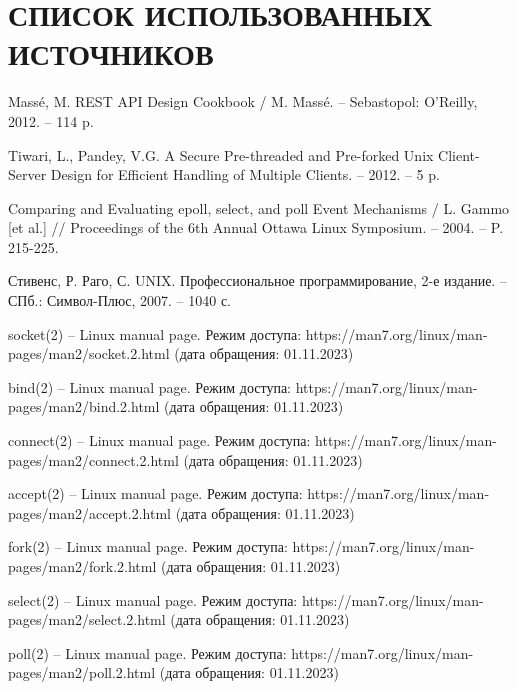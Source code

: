 \section*{СПИСОК ИСПОЛЬЗОВАННЫХ ИСТОЧНИКОВ}

\begingroup
\renewcommand{\section}[2]{}
\begin{thebibliography}{}
	Massé, M. REST API Design Cookbook / M. Massé. -- Sebastopol: O’Reilly, 2012. -- 114 p.
	
	Tiwari, L., Pandey, V.G. A Secure Pre-threaded and Pre-forked Unix Client-Server Design for Efficient Handling of Multiple Clients. -- 2012. -- 5 p. 
	
	Comparing and Evaluating epoll, select, and poll
	Event Mechanisms / L. Gammo [et al.] // Proceedings of the 6th Annual Ottawa Linux Symposium. -- 2004. -- P. 215-225.
	
	Стивенс, Р. Раго, С. UNIX. Профессиональное программирование, 2-е издание. -- СПб.: Символ-Плюс, 2007. -- 1040 с. 
	
	socket(2) -- Linux manual page. Режим доступа: https://man7.org/linux/man-pages/man2/socket.2.html (дата обращения: 01.11.2023)
	
	bind(2) -- Linux manual page. Режим доступа: https://man7.org/linux/man-pages/man2/bind.2.html (дата обращения: 01.11.2023)
	
	connect(2) -- Linux manual page. Режим доступа: https://man7.org/linux/man-pages/man2/connect.2.html (дата обращения: 01.11.2023)
	
	accept(2) -- Linux manual page. Режим доступа: https://man7.org/linux/man-pages/man2/accept.2.html (дата обращения: 01.11.2023)
	
	fork(2) -- Linux manual page. Режим доступа: https://man7.org/linux/man-pages/man2/fork.2.html (дата обращения: 01.11.2023)
	
	select(2) -- Linux manual page. Режим доступа: https://man7.org/linux/man-pages/man2/select.2.html (дата обращения: 01.11.2023)
	
	poll(2) -- Linux manual page. Режим доступа: https://man7.org/linux/man-pages/man2/poll.2.html (дата обращения: 01.11.2023)
	

\end{thebibliography}
